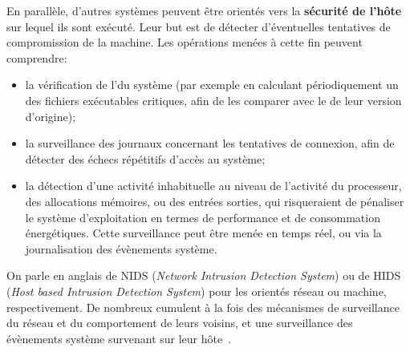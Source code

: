 En parallèle, d'autres systèmes peuvent être orientés vers la \textbf{sécurité de l'hôte} sur lequel ils sont exécuté.
Leur but est de détecter d'éventuelles tentatives de compromission de la machine.
Les opérations menées à cette fin peuvent comprendre:
\begin{itemize}
    \item la vérification de l'\integrite du système (par exemple en calculant périodiquement un  des fichiers exécutables critiques, afin de les comparer avec le  de leur version d'origine);
    \item la surveillance des journaux concernant les tentatives de connexion, afin de détecter des échecs répétitifs d'accès au système;
    \item la détection d'une activité inhabituelle au niveau de l'activité du processeur, des allocations mémoires, ou des entrées sorties, qui risqueraient de pénaliser le système d'exploitation en termes de performance et de consommation énergétiques. Cette surveillance peut être menée en temps réel, ou via la journalisation des évènements système.
\end{itemize}
On parle en anglais de NIDS (\textit{Network Intrusion Detection System}) ou de HIDS (\textit{Host based Intrusion Detection System}) pour les \IDS orientés réseau ou machine, respectivement.
De nombreux \IDS cumulent à la fois des mécanismes de surveillance du réseau et du comportement de leurs voisins, et une surveillance des évènements système survenant sur leur hôte~\cite{BMS13}.

